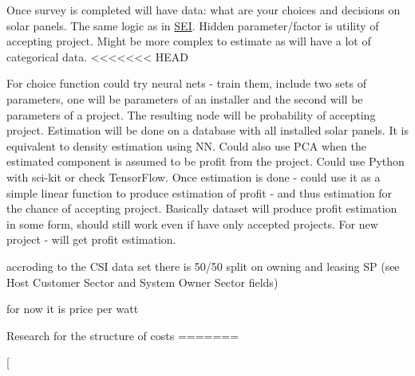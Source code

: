 
\begin{DoxyRefList}
\item[\label{wp__wp000001}%
\hypertarget{wp__wp000001}{}%
Class \hyperlink{classsolar__core_1_1_household}{solar\+\_\+core\+:\+:Household} ]Once survey is completed will have data\+: what are your choices and decisions on solar panels. The same logic as in \hyperlink{classsolar__core_1_1_s_e_i}{S\+E\+I}. Hidden parameter/factor is utility of accepting project. Might be more complex to estimate as will have a lot of categorical data. 
<<<<<<< HEAD
\item[\label{wp__wp000004}%
\hypertarget{wp__wp000004}{}%
Class \hyperlink{classsolar__core_1_1_s_e_i}{solar\+\_\+core\+:\+:S\+E\+I} ]For choice function could try neural nets -\/ train them, include two sets of parameters, one will be parameters of an installer and the second will be parameters of a project. The resulting node will be probability of accepting project. Estimation will be done on a database with all installed solar panels. It is equivalent to density estimation using N\+N. Could also use P\+C\+A when the estimated component is assumed to be profit from the project. Could use Python with sci-\/kit or check Tensor\+Flow. Once estimation is done -\/ could use it as a simple linear function to produce estimation of profit -\/ and thus estimation for the chance of accepting project. Basically dataset will produce profit estimation in some form, should still work even if have only accepted projects. For new project -\/ will get profit estimation. 
\item[\label{wp__wp000003}%
\hypertarget{wp__wp000003}{}%
Member \hyperlink{classsolar__core_1_1_s_e_i_a807561ad055ddc0df91b80ba406ee6df}{solar\+\_\+core\+:\+:S\+E\+I\+:\+:form\+\_\+design} (std\+::shared\+\_\+ptr$<$ P\+V\+Project $>$ project\+\_\+)]accroding to the C\+S\+I data set there is 50/50 split on owning and leasing S\+P (see Host Customer Sector and System Owner Sector fields) 
\item[\label{wp__wp000002}%
\hypertarget{wp__wp000002}{}%
Member \hyperlink{classsolar__core_1_1_s_e_i_ad532ca9d30d5988e051b75e33ce6c241}{solar\+\_\+core\+:\+:S\+E\+I\+:\+:form\+\_\+online\+\_\+quote} (std\+::shared\+\_\+ptr$<$ P\+V\+Project $>$ project\+\_\+)]for now it is price per watt  
\item[\label{wp__wp000005}%
\hypertarget{wp__wp000005}{}%
Class \hyperlink{classsolar__core_1_1_s_e_m}{solar\+\_\+core\+:\+:S\+E\+M} ]Research for the structure of costs 
=======
\item[\label{wp__wp000002}%

\end{DoxyRefList}
